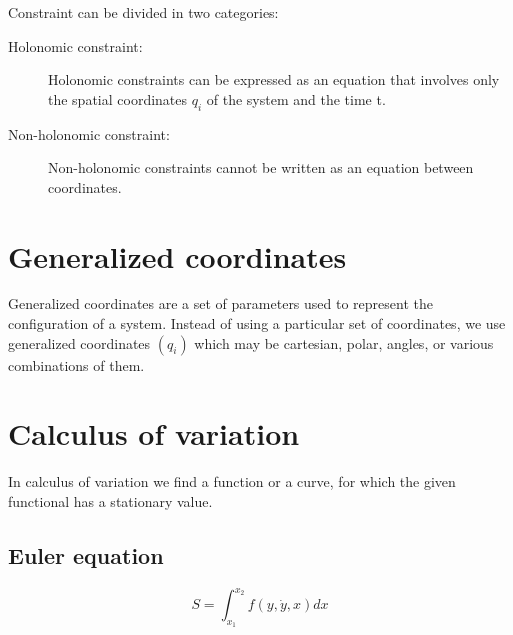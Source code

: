 \documentclass{article}
\begin{document}
Constraint can be divided in two categories:
\begin{description}
    \item[Holonomic constraint:] Holonomic constraints can be expressed as an equation that involves only the spatial coordinates $q_i$
    of the system and the time t.   
    \item[Non-holonomic constraint:] Non-holonomic constraints cannot be written as an equation between coordinates.
\end{description}

\section*{Generalized coordinates}
Generalized coordinates are a set of parameters used to represent the configuration of a system. Instead of using a particular 
set of coordinates, we use generalized coordinates $(q_i)$ which may be cartesian, polar, angles, or various combinations of them.

\newpage
\section*{Calculus of variation}
In calculus of variation we find a function or a curve, for which the given functional has a stationary value.
\subsection*{Euler equation}
 
$$S = \int_{x_1}^{x_2}f(y,\dot{y},x)dx $$
\end{document}
